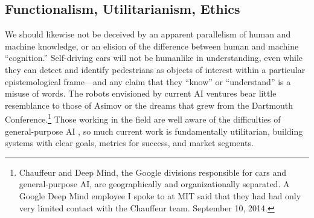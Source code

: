 \subsection{Functionalism, Utilitarianism, Ethics} 

We should likewise not be deceived by an apparent parallelism of human
and machine knowledge, or an elision of the difference between human
and machine ``cognition.'' Self-driving cars will not be humanlike in
understanding, even while they can detect and identify pedestrians as
objects of interest within a particular epistemological frame---and
any claim that they ``know'' or ``understand'' is a misuse of words. The
robots envisioned by current AI 
ventures bear little resemblance to those of Asimov or the dreams that grew
from the Dartmouth Conference.\footnote{Chauffeur and Deep Mind, the
  Google divisions responsible for cars and general-purpose AI, are
geographically and organizationally separated. A Google Deep Mind
employee I spoke to at MIT said that they had had only very limited
contact with the Chauffeur team. September 10, 2014.}  Those working
in the field are well aware of 
the difficulties of general-purpose AI \cite{sofgeAIFears}, so much
current work is 
fundamentally utilitarian, building systems with clear goals, metrics
for success, and market segments.


